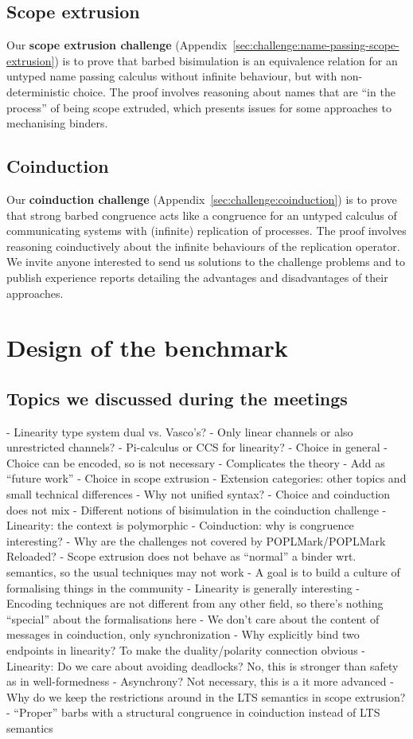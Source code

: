 \documentclass[runningheads]{llncs}
\begin{document}
\subsection{Scope extrusion}
Our \textbf{scope extrusion challenge} (Appendix~\ref{sec:challenge:name-passing-scope-extrusion}) is to prove that barbed bisimulation is an equivalence relation for an untyped name passing calculus without infinite behaviour, but with non-deterministic choice.
The proof involves reasoning about names that are ``in the process'' of being scope extruded, which presents issues for some approaches to mechanising binders.

\subsection{Coinduction}
Our \textbf{coinduction challenge} (Appendix~\ref{sec:challenge:coinduction}) is to prove that strong barbed congruence acts like a congruence for an untyped calculus of communicating systems with (infinite) replication of processes.
The proof involves reasoning coinductively about the infinite behaviours of the replication operator.
We invite anyone interested to send us solutions to the challenge problems and to publish experience reports detailing the advantages and disadvantages of their approaches.

\section{Design of the benchmark}\label{sec:design-discussion}
\subsection{Topics we discussed during the meetings}
- Linearity type system dual vs. Vasco's?
- Only linear channels or also unrestricted channels?
- Pi-calculus or CCS for linearity?
- Choice in general
  - Choice can be encoded, so is not necessary
  - Complicates the theory
  - Add as ``future work''
- Choice in scope extrusion
- Extension categories: other topics and small technical differences
- Why not unified syntax?
  - Choice and coinduction does not mix
- Different notions of bisimulation in the coinduction challenge
- Linearity: the context is polymorphic
- Coinduction: why is congruence interesting?
- Why are the challenges not covered by POPLMark/POPLMark Reloaded?
- Scope extrusion does not behave as ``normal'' a binder wrt. semantics, so the usual techniques may not work
- A goal is to build a culture of formalising things in the community
- Linearity is generally interesting
- Encoding techniques are not different from any other field, so there's nothing ``special'' about the formalisations here
- We don't care about the content of messages in coinduction, only synchronization
- Why explicitly bind two endpoints in linearity? To make the duality/polarity connection obvious
- Linearity: Do we care about avoiding deadlocks? No, this is stronger than safety as in well-formedness
- Asynchrony? Not necessary, this is a it more advanced
- Why do we keep the restrictions around in the LTS semantics in scope extrusion?
- ``Proper'' barbs with a structural congruence in coinduction instead of LTS semantics
\end{document}
